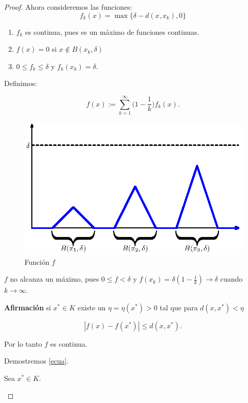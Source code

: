 \documentclass[a4,portrait]{seminar}
\begin{document}
\begin{slide*}
\begin{proof}
Ahora consideremos las funciones:
\[
    f_k(x)=\max\{\delta-d(x,x_k), 0\}
\]

\begin{enumerate}
    \item  $f_k$ es continua, pues es un m\'aximo de funciones
            continuas.
    \item  $f(x)=0$ si $x\notin B(x_k,\delta)$
    \item  $0\leq f _k\leq\delta$ y $f_k(x_k)=\delta$.
\end{enumerate}
 Definimos:

\[
    f(x):=\sum\limits_{k=1}^{\infty}\biggl(1-\frac{1}{k}\biggr) f_k(x).
\]


\setlength{\unitlength}{70mm}
\begin{figure}[h]
    \includegraphics[width=.9\unitlength,height=0.57\unitlength]{figura3.eps}
\caption{Funci\'on $f$}\label{funcnoacot}
\end{figure}

$f$   no alcanza un m\'aximo, pues $0 \leq f<\delta$ y
$f(x_k)=\delta (1-\frac{1}{k})\to\delta$ cuando $k\to\infty$.

\newpage

\textbf{Afirmaci\'on} si $x^*\in K$ existe un $\eta=\eta(x^*)>0$
tal que para $d(x,x^*)<\eta$


\begin{equation}\label{ecua}
    |f(x)-f(x^*)|\leq d(x,x^*).
\end{equation}

Por lo tanto $f$ es continua.


Demostremos \eqref{ecua}.

Sea $x^*\in K$.

\begin{enumerate}


\end{enumerate}
\end{proof}
\end{slide*}
\end{document}
